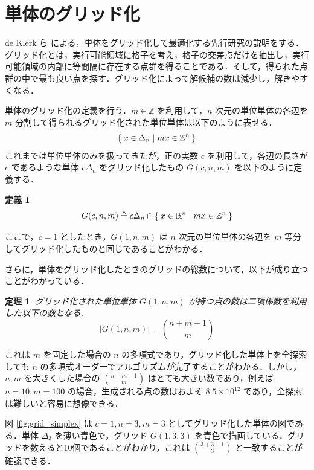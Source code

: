 \documentclass[a4paper,11pt]{jreport}
\newtheorem{definition}{定義}
\newtheorem{theorem}{定理}
\begin{document}
\section{単体のグリッド化}

de Klerk ら \cite{deklerk} による，単体をグリッド化して最適化する先行研究の説明をする．グリッド化とは，実行可能領域に格子を考え，格子の交差点だけを抽出し，実行可能領域の内部に等間隔に存在する点群を得ることである．そして，得られた点群の中で最も良い点を探す．グリッド化によって解候補の数は減少し，解きやすくなる．\par
単体のグリッド化の定義を行う．$ m \in \mathbb{Z} $ を利用して，$ n $ 次元の単位単体の各辺を $ m $ 分割して得られるグリッド化された単位単体は以下のように表せる．
$$ \Set{ x \in \Delta_n | mx \in \mathbb{Z}^n } $$
これまでは単位単体のみを扱ってきたが，正の実数 $ c $ を利用して，各辺の長さが $ c $ であるような単体 $ c \Delta_n $ をグリッド化したもの $ G(c, n, m) $ を以下のように定義する．

\begin{definition}
$$ G(c, n, m) \triangleq c \Delta_n \cap \Set{x \in \mathbb{R}^n | mx \in \mathbb{Z}^n} $$
\end{definition}

ここで，$ c = 1 $ としたとき，$ G(1, n, m) $ は $ n $ 次元の単位単体の各辺を $ m $ 等分してグリッド化したものと同じであることがわかる．\par
さらに，単体をグリッド化したときのグリッドの総数について，以下が成り立つことがわかっている．

\begin{theorem} \label{thm:n_grid}
グリッド化された単位単体 $ G(1, n, m) $ が持つ点の数は二項係数を利用した以下の数となる．
$$ | G(1, n, m) | = \binom{n + m - 1}{m} $$
\end{theorem}

これは $ m $ を固定した場合の $ n $ の多項式であり，グリッド化した単体上を全探索しても $ n $ の多項式オーダーでアルゴリズムが完了することがわかる．しかし，$ n, m $ を大きくした場合の $ \binom{n + m - 1}{m} $ はとても大きい数であり，例えば $ n = 10, m = 100 $ の場合，生成される点の数はおよそ $ 8.5 \times 10^{12} $ であり，全探索は難しいと容易に想像できる．\par
図 \ref{fig:grid_simplex} は $ c=1, n=3, m=3 $ としてグリッド化した単体の図である．単体 $ \Delta_3 $ を薄い青色で，グリッド $ G(1, 3, 3) $ を青色で描画している．グリッドを数えると10個であることがわかり，これは $ \binom{3 + 3 - 1}{3} $ と一致することが確認できる．\par
\end{document}
